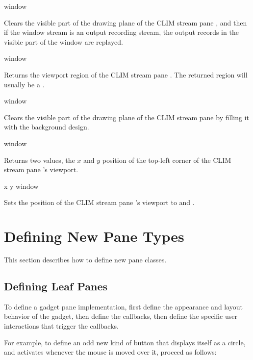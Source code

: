  {window}

Clears the visible part of the drawing plane of the CLIM stream pane
, and then if the window stream is an output recording stream, the
output records in the visible part of the window are replayed.

 {window}

Returns the viewport region of the CLIM stream pane .  The returned
region will usually be a .

 {window}

Clears the visible part of the drawing plane of the CLIM stream pane
 by filling it with the background design.

 {window}

Returns two values, the $x$ and $y$ position of the top-left corner of the CLIM
stream pane 's viewport.

 {x y window}

Sets the position of the CLIM stream pane 's viewport to  and
.


\section {Defining New Pane Types}

This section describes how to define new pane classes.

\subsection {Defining Leaf Panes}

To define a gadget pane implementation, first define the appearance and layout
behavior of the gadget, then define the callbacks, then define the specific user
interactions that trigger the callbacks.

For example, to define an odd new kind of button that displays itself as a
circle, and activates whenever the mouse is moved over it, proceed as follows:

